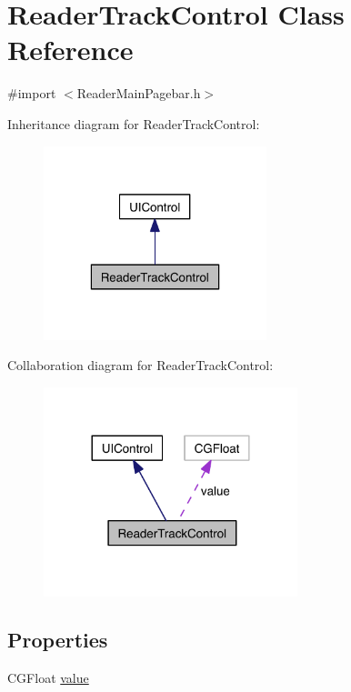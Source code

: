 \hypertarget{interface_reader_track_control}{\section{Reader\-Track\-Control Class Reference}
\label{dc/d59/interface_reader_track_control}
}


{\ttfamily \#import $<$Reader\-Main\-Pagebar.\-h$>$}



Inheritance diagram for Reader\-Track\-Control\-:
\nopagebreak
\begin{figure}[H]
\begin{center}
\leavevmode
\includegraphics[width=184pt]{d4/d54/interface_reader_track_control__inherit__graph}
\end{center}
\end{figure}


Collaboration diagram for Reader\-Track\-Control\-:
\nopagebreak
\begin{figure}[H]
\begin{center}
\leavevmode
\includegraphics[width=209pt]{de/d1e/interface_reader_track_control__coll__graph}
\end{center}
\end{figure}
\subsection*{Properties}
\begin{DoxyCompactItemize}
\item 
C\-G\-Float \hyperlink{interface_reader_track_control_a2a91dd40b3e8d4757ac201fe8a3b9829}{value}
\end{DoxyCompactItemize}


